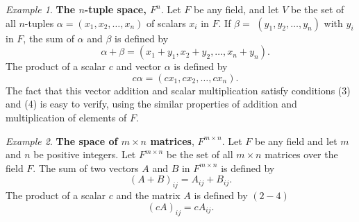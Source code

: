 \documentclass{book}
\theoremstyle{remark}
\newtheorem{example}{Example}[section]
\theoremstyle{definition}
\begin{document}
\begin{example}\label{n-tuple_space}
\textbf{The $n$-tuple space, $F^n$}. Let $F$ be any field, and let $V$ be the set of all $n$-tuples $\alpha=\left(x_1, x_2, \ldots, x_n\right)$ of scalars $x_i$ in $F$. If $\beta=$ $\left(y_1, y_2, \ldots, y_n\right)$ with $y_i$ in $F$, the sum of $\alpha$ and $\beta$ is defined by
$$\quad \alpha+\beta=\left(x_1+y_1, x_2+y_2, \ldots, x_n+y_n\right).$$
The product of a scalar $c$ and vector $\alpha$ is defined by
$$\quad c \alpha=\left(c x_1, c x_2, \ldots, c x_n\right).$$
The fact that this vector addition and scalar multiplication satisfy conditions (3) and (4) is easy to verify, using the similar properties of addition and multiplication of elements of $F$.
\end{example}
\begin{example}
\textbf{The space of $m \times n$ matrices}, $F^{m \times n}$. Let $F$ be any field and let $m$ and $n$ be positive integers. Let $F^{m \times n}$ be the set of all $m \times n$ matrices over the field $F$. The sum of two vectors $A$ and $B$ in $F^{m \times n}$ is defined by
$$
(A+B)_{i j}=A_{i j}+B_{i j} .
$$
The product of a scalar $c$ and the matrix $A$ is defined by $(2-4)$
$$
(c A)_{i j}=c A_{i j} .
$$
\end{example}
\end{document}
